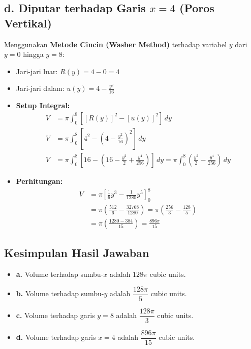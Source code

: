 \documentclass[12pt,a4paper]{article}
\begin{document}
\subsection*{d. Diputar terhadap Garis $x = 4$ (Poros Vertikal)}
Menggunakan \textbf{Metode Cincin (Washer Method)} terhadap variabel $y$ dari $y = 0$ hingga $y = 8$:
\begin{itemize}
  \item Jari-jari luar: $R(y) = 4 - 0 = 4$
  \item Jari-jari dalam: $u(y) = 4 - \frac{y^2}{16}$
  \item \textbf{Setup Integral:}
    \begin{align*}
      V &= \pi \int_{0}^{8} \left[ [R(y)]^2 - [u(y)]^2 \right] \, dy \\
      V &= \pi \int_{0}^{8} \left[ 4^2 - \left(4 - \frac{y^2}{16}\right)^2 \right] \, dy \\
      V &= \pi \int_{0}^{8} \left[ 16 - \left(16 - \frac{y^2}{2} + \frac{y^4}{256}\right) \right] \, dy = \pi \int_{0}^{8} \left( \frac{y^2}{2} - \frac{y^4}{256} \right) \, dy
    \end{align*}
  \item \textbf{Perhitungan:}
    \begin{align*}
      V &= \pi \left[ \frac{1}{6}y^3 - \frac{1}{1280}y^5 \right]_{0}^{8} \\
      &= \pi \left( \frac{512}{6} - \frac{32768}{1280} \right) = \pi \left( \frac{256}{3} - \frac{128}{5} \right) \\
      &= \pi \left( \frac{1280 - 384}{15} \right) = \frac{896\pi}{15}
    \end{align*}
\end{itemize}

\subsection*{Kesimpulan Hasil Jawaban}
\begin{itemize}
  \item \textbf{a.} Volume terhadap sumbu-$x$ adalah \textbf{$128\pi$} cubic units.
  \item \textbf{b.} Volume terhadap sumbu-$y$ adalah \textbf{$\dfrac{128\pi}{5}$} cubic units.
  \item \textbf{c.} Volume terhadap garis $y = 8$ adalah \textbf{$\dfrac{128\pi}{3}$} cubic units.
  \item \textbf{d.} Volume terhadap garis $x = 4$ adalah \textbf{$\dfrac{896\pi}{15}$} cubic units.
\end{itemize}
\end{document}

